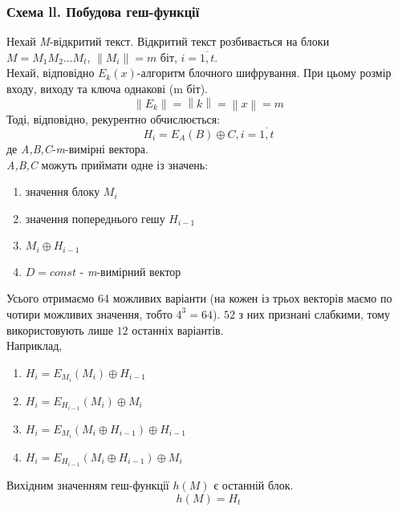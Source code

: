 \subsubsection*{Схема ll. Побудова геш-функції}
Нехай \textit{M}-відкритий текст. Відкритий текст розбивається на блоки \textit{$M=M_1M_2\ldots M_t$}, \textit{$\left\|M_i\right\|=m$} біт, \textit{$i=\overline{1,t}$}.\\
Нехай, відповідно \textit{$E_k(x)$}-алгоритм блочного шифрування. При цьому розмір входу, виходу та ключа однакові (m біт).
\textit{$$\left\|E_k \right\| = \left\| k \right\| = \left\| x \right\| = m $$}
Тоді, відповідно, рекурентно обчислюється:
$$H_i=E_A(B) \oplus C, \textit{$i=\overline{1,t}$}$$
де \textit{A,B,C}-\textit{m}-вимірні вектора.\\
\textit{A,B,C} можуть приймати одне із значень:
\begin{enumerate}
        \item значення блоку \textit{$M_i$}
        \item значення попереднього гешу \textit{$H_{i-1}$}
        \item $M_i \oplus H_{i-1}$
        \item $D=const$ - \textit{m}-вимірний вектор
\end{enumerate}
Усього отримаємо 64 можливих варіанти (на кожен із трьох векторів маємо по чотири можливих значення, тобто $4^3=64$). $52$ з них признані слабкими, тому використовують лише $12$ останніх варіантів.\\
Наприклад,
\begin{enumerate}
        \item $H_i=E_{M_i}(M_i) \oplus H_{i-1}$
        \item $H_i=E_{H_{i-1}}(M_i) \oplus M_i$
        \item $H_i=E_{M_i}(M_i \oplus H_{i-1}) \oplus H_{i-1}$
        \item $H_i=E_{H_{i-1}}(M_i \oplus H_{i-1}) \oplus M_i$
\end{enumerate}
Вихідним значенням геш-функції \textit{$h(M)$} є останній блок.$$h(M)=H_t$$
